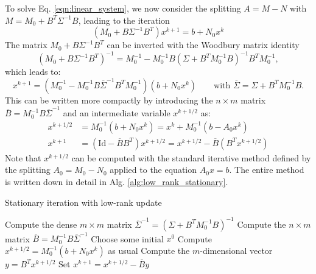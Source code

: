 \documentclass[11pt]{article}
\begin{document}
To solve Eq. \eqref{eqn:linear_system}, we now consider the splitting $A=M-N$ with $M=M_0 + B^T \Sigma^{-1} B$, leading to the iteration
\begin{equation}
    \left(M_0 + B \Sigma^{-1} B^T \right)x^{k+1} = b + N_0 x^k\label{eqn:low_rank_iteration}
\end{equation}
The matrix $M_0 + B \Sigma^{-1}B^T$ can be inverted with the Woodbury matrix identity
\begin{equation}
    \left(M_0 + B \Sigma^{-1} B^T \right)^{-1} = M_0^{-1} - M_0^{-1} B \left(\Sigma + B^TM_0^{-1}B\right)^{-1}B^TM_0^{-1},
\end{equation}
which leads to:
\begin{equation}
    x^{k+1} = \left(M_0^{-1}-M_0^{-1}B \overline{\Sigma}^{-1}B^T M_0^{-1}\right)\left(b+N_0x^k\right)
    \qquad\text{with $\overline{\Sigma} = \Sigma + B^TM_0^{-1}B$}.
\end{equation}
This can be written more compactly by introducing the $n\times m$ matrix $\overline{B} = M_0^{-1} B \overline{\Sigma}^{-1}$ and an intermediate variable $x^{k+1/2}$ as:
\begin{equation}
    \begin{aligned}
        x^{k+1/2} & = M_0^{-1}(b+N_0x^k) = x^k + M_0^{-1}(b-A_0x^k)                                                           \\
        x^{k+1}   & = \left(\text{Id}-\overline{B} B^T\right) x^{k+1/2} = x^{k+1/2} - \overline{B} \left(B^T x^{k+1/2}\right)
    \end{aligned}
\end{equation}
Note that $x^{k+1/2}$ can be computed with the standard iterative method defined by the splitting $A_0=M_0-N_0$ applied to the equation $A_0x=b$. The entire method is written down in detail in Alg. \ref{alg:low_rank_stationary}.
\begin{algorithm}
    \caption{Stationary iteration with low-rank update}\label{alg:low_rank_stationary}
    \begin{algorithmic}[1]
        \State Compute the dense $m\times m$ matrix $\overline{\Sigma}^{-1} = (\Sigma+B^TM_0^{-1}B)^{-1}$
        \State Compute the $n\times m$ matrix $\overline{B}= M_0^{-1} B\overline{\Sigma}^{-1}$
        \State Choose some initial $x^0$
        \State Compute $x^{k+1/2} = M_0^{-1} (b+N_0 x^k)$ as usual
        \State Compute the $m$-dimensional vector $y = B^T x^{k+1/2}$
        \State Set $x^{k+1} = x^{k+1/2} - \overline{B} y$
        \EndFor
    \end{algorithmic}
\end{algorithm}
\end{document}
